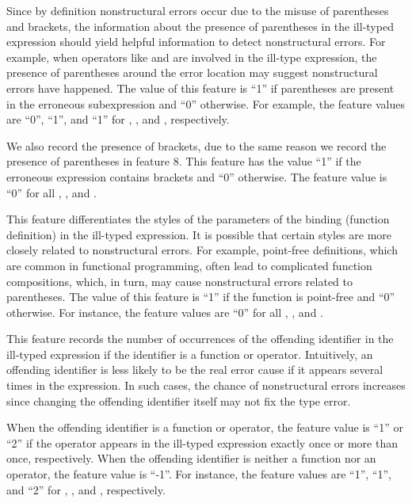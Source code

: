\documentclass[12pt]{report}	%
\begin{document}
%
Since by definition  nonstructural errors
occur due to the misuse of parentheses and brackets,
the information about the presence of 
parentheses in the ill-typed expression should
yield helpful information to detect nonstructural errors.
For example, 
when operators like \prog{:} and \prog{++} are involved
in the ill-type expression,
the presence of parentheses around the error location
may suggest nonstructural errors have happened. 
%
The value of this feature is ``1'' if parentheses
are present in the erroneous subexpression and ``0''
otherwise. 
%
For example, the feature values are ``0'', ``1'', and ``1''
for , , and ,
respectively. 

%
We also record the presence of brackets, due to the same
reason we record the presence of parentheses in feature 8.
This feature has the
value ``1'' if the erroneous expression contains brackets
and ``0'' otherwise. The feature value is ``0'' for all
, , and .


%
This feature differentiates the styles of the 
parameters of the binding (function definition)
in the ill-typed expression. 
%
It is possible that certain styles are more closely
related to nonstructural errors. 
For example, 
point-free definitions, which are common in functional programming,
often lead to complicated function compositions, which, in turn,
may cause nonstructural errors related to parentheses.
%
The value of this feature is ``1'' if the function
is point-free and ``0'' otherwise.
%
For instance, the feature values are ``0''
for all , , and .


%
This feature records 
the number of occurrences of the offending identifier
in the ill-typed expression if the identifier
is a function or operator.
Intuitively, an offending identifier is less likely to 
be the real error cause 
if it appears several times in the expression.
%
In such cases, the chance of nonstructural errors
increases since changing the offending
identifier itself may not fix the type error.


When the offending identifier
is a function or operator,
the feature value is ``1'' or ``2'' 
if the operator appears in the ill-typed expression 
exactly once or more than once, respectively. 
%
When the offending identifier is neither a function nor
an operator, the feature value
is ``-1''.
%
For instance, the feature values are ``1'', ``1'', 
and ``2'' for
, , and , 
respectively.
\end{document}
